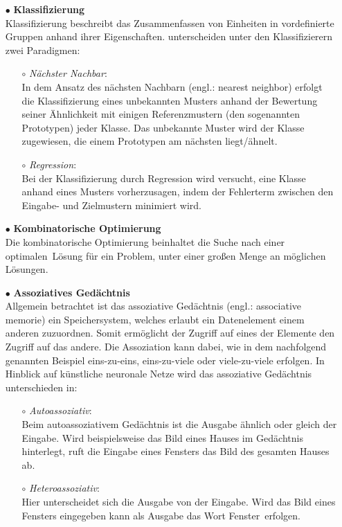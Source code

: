 \begin{itemize}
\item[\textbf{$\bullet$}] \textbf{Klassifizierung}\\%
Klassifizierung beschreibt das Zusammenfassen von Einheiten in vordefinierte Gruppen anhand ihrer Eigenschaften.
\citet{Fiesler96} unterscheiden unter den Klassifizierern zwei Paradigmen:
    \begin{itemize}
    \item[\textbf{$\circ$}] \textit{Nächster Nachbar}:\\%
    In dem Ansatz des nächsten Nachbarn (engl.: nearest neighbor) erfolgt die Klassifizierung eines unbekannten Musters anhand der Bewertung seiner Ähnlichkeit mit einigen Referenzmustern (den sogenannten Prototypen) jeder Klasse. Das unbekannte Muster wird der Klasse zugewiesen, die einem Prototypen am nächsten liegt/ähnelt.
    
    \item[\textbf{$\circ$}] \textit{Regression}:\\%
    Bei der Klassifizierung durch Regression wird versucht, eine Klasse anhand eines Musters vorherzusagen, indem der Fehlerterm zwischen den Eingabe- und Zielmustern minimiert wird.
    \end{itemize}


\item[\textbf{$\bullet$}] \textbf{Kombinatorische Optimierung}\\%
Die kombinatorische Optimierung beinhaltet die Suche nach einer \glqq optimalen\grqq~Lösung für ein Problem, unter einer großen Menge an möglichen Lösungen. 
 

\item[\textbf{$\bullet$}] \textbf{Assoziatives Gedächtnis}\\%
Allgemein betrachtet ist das assoziative Gedächtnis (engl.: associative memorie) ein Speichersystem, welches erlaubt ein Datenelement einem anderen zuzuordnen. Somit ermöglicht der Zugriff auf eines der Elemente den Zugriff auf das andere.
Die Assoziation kann dabei, wie in dem nachfolgend genannten Beispiel eins-zu-eins, eins-zu-viele oder viele-zu-viele erfolgen.
In Hinblick auf künstliche neuronale Netze wird das assoziative Gedächtnis unterschieden in:
    \begin{itemize}
    \item[\textbf{$\circ$}] \textit{Autoassoziativ}:\\%
    Beim autoassoziativem Gedächtnis ist die Ausgabe ähnlich oder gleich der Eingabe. Wird beispielsweise das Bild eines Hauses im Gedächtnis \glqq hinterlegt\grqq , ruft die Eingabe eines Fensters das Bild des gesamten Hauses ab.
    
    \item[\textbf{$\circ$}] \textit{Heteroassoziativ}:\\%
    Hier unterscheidet sich die Ausgabe von der Eingabe. Wird das Bild eines Fensters eingegeben kann als Ausgabe das Wort \glqq Fenster\grqq~erfolgen.\,
    
    \end{itemize}

\end{itemize}

